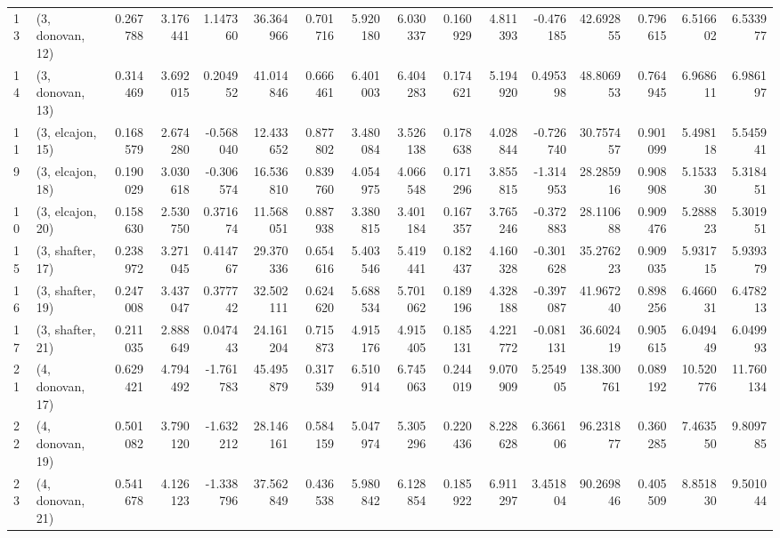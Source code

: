 \begin{tabular}{llrrrrrrrrrrrrrr}
13 &  (3, donovan, 12) &   0.267788 &  3.176441 &  1.147360 &  36.364966 &  0.701716 &   5.920180 &  6.030337 &  0.160929 &  4.811393 & -0.476185 &   42.692855 &  0.796615 &   6.516602 &   6.533977 \\
14 &  (3, donovan, 13) &   0.314469 &  3.692015 &  0.204952 &  41.014846 &  0.666461 &   6.401003 &  6.404283 &  0.174621 &  5.194920 &  0.495398 &   48.806953 &  0.764945 &   6.968611 &   6.986197 \\
11 &  (3, elcajon, 15) &   0.168579 &  2.674280 & -0.568040 &  12.433652 &  0.877802 &   3.480084 &  3.526138 &  0.178638 &  4.028844 & -0.726740 &   30.757457 &  0.901099 &   5.498118 &   5.545941 \\
9  &  (3, elcajon, 18) &   0.190029 &  3.030618 & -0.306574 &  16.536810 &  0.839760 &   4.054975 &  4.066548 &  0.171296 &  3.855815 & -1.314953 &   28.285916 &  0.908908 &   5.153330 &   5.318451 \\
10 &  (3, elcajon, 20) &   0.158630 &  2.530750 &  0.371674 &  11.568051 &  0.887938 &   3.380815 &  3.401184 &  0.167357 &  3.765246 & -0.372883 &   28.110688 &  0.909476 &   5.288823 &   5.301951 \\
15 &  (3, shafter, 17) &   0.238972 &  3.271045 &  0.414767 &  29.370336 &  0.654616 &   5.403546 &  5.419441 &  0.182437 &  4.160328 & -0.301628 &   35.276223 &  0.909035 &   5.931715 &   5.939379 \\
16 &  (3, shafter, 19) &   0.247008 &  3.437047 &  0.377742 &  32.502111 &  0.624620 &   5.688534 &  5.701062 &  0.189196 &  4.328188 & -0.397087 &   41.967240 &  0.898256 &   6.466031 &   6.478213 \\
17 &  (3, shafter, 21) &   0.211035 &  2.888649 &  0.047443 &  24.161204 &  0.715873 &   4.915176 &  4.915405 &  0.185131 &  4.221772 & -0.081131 &   36.602419 &  0.905615 &   6.049449 &   6.049993 \\
21 &  (4, donovan, 17) &   0.629421 &  4.794492 & -1.761783 &  45.495879 &  0.317539 &   6.510914 &  6.745063 &  0.244019 &  9.070909 &  5.254905 &  138.300761 &  0.089192 &  10.520776 &  11.760134 \\
22 &  (4, donovan, 19) &   0.501082 &  3.790120 & -1.632212 &  28.146161 &  0.584159 &   5.047974 &  5.305296 &  0.220436 &  8.228628 &  6.366106 &   96.231877 &  0.360285 &   7.463550 &   9.809785 \\
23 &  (4, donovan, 21) &   0.541678 &  4.126123 & -1.338796 &  37.562849 &  0.436538 &   5.980842 &  6.128854 &  0.185922 &  6.911297 &  3.451804 &   90.269846 &  0.405509 &   8.851830 &   9.501044 \\

\end{tabular}
